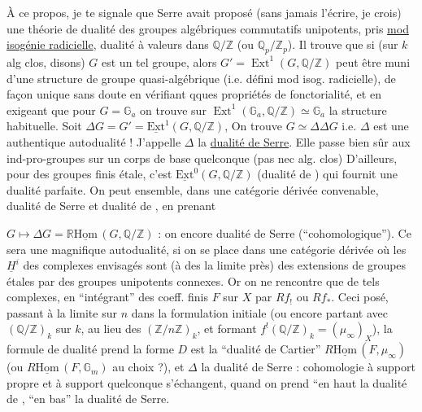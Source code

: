 À ce propos, je te signale que Serre avait proposé (sans jamais l'écrire, je crois) une théorie de dualité des groupes algébriques commutatifs unipotents,  pris \uline{mod isogénie radicielle}, dualité à valeurs dans $\mathbb{Q}/\mathbb{Z}$ (ou $\mathbb{Q}_p/\mathbb{Z}_p$). Il trouve que si (sur $k$ alg clos, disons) $G$ est un tel groupe, alors $G'=\operatorname{Ext}^{1}(G,\mathbb{Q}/\mathbb{Z})$ peut être muni  d'une structure de groupe quasi-algébrique (i.e. défini mod isog. radicielle), de façon unique sans doute en vérifiant qques propriétés de fonctorialité, et en exigeant que pour $G=\mathbb{G}_a$ on trouve sur $\operatorname{Ext}^{1}(\mathbb{G}_a,\mathbb{Q}/\mathbb{Z})\simeq\mathbb{G}_a$ la structure habituelle. Soit $\Delta G=G'=\underline{\mathrm{Ext}}^{1}(G,\mathbb{Q}/\mathbb{Z})$, On trouve $G\simeq\Delta\Delta G$ i.e. $\Delta$ est une authentique autodualité ! J'appelle $\Delta$ la \uline{dualité de Serre}. Elle passe bien sûr aux ind-pro-groupes sur un corps de base quelconque (pas nec alg. clos)  D'ailleurs, pour des groupes finis étale, c'est $\underline{\mathrm{Ext}}^{0}(G,\mathbb{Q}/\mathbb{Z})$ (dualité de ) qui fournit une dualité parfaite. On peut  ensemble, dans une catégorie dérivée convenable, dualité de Serre et dualité de , en prenant

$G\longmapsto\Delta G=\mathbb{R}\underline{\mathrm{Hom}}\,(G,\mathbb{Q}/\mathbb{Z})$ : on  encore dualité de Serre (``cohomologique''). Ce sera une magnifique autodualité, si on se place dans une catégorie dérivée où les $\underline{H}^{i}$ des complexes envisagés sont (à des   la limite près) des extensions de groupes étales par des groupes unipotents connexes. Or on ne rencontre que de tels complexes, en ``intégrant'' des coeff. finis $F$ sur $X$ par $Rf_!$ ou $Rf_*$. Ceci posé, passant à la limite sur $n$ dans la formulation initiale (ou encore partant avec $(\mathbb{Q}/\mathbb{Z})_k$ sur $k$, au lieu des $(\mathbb{Z}/n\mathbb{Z})_k$, et formant $f^!(\mathbb{Q}/\mathbb{Z})_k=(\mu_\infty)_X$), la formule de dualité prend la forme
 $D$ est la ``dualité de Cartier'' $R\underline{\mathrm{Hom}}\,(F,\mu_\infty)$ (ou $R\underline{\mathrm{Hom}}\,(F,\mathbb{G}_m)$ au choix ?), et $\Delta$ la dualité de Serre : cohomologie à support propre et à support quelconque s'échangent, quand on prend ``en haut la dualité de , ``en bas'' la dualité de Serre.


